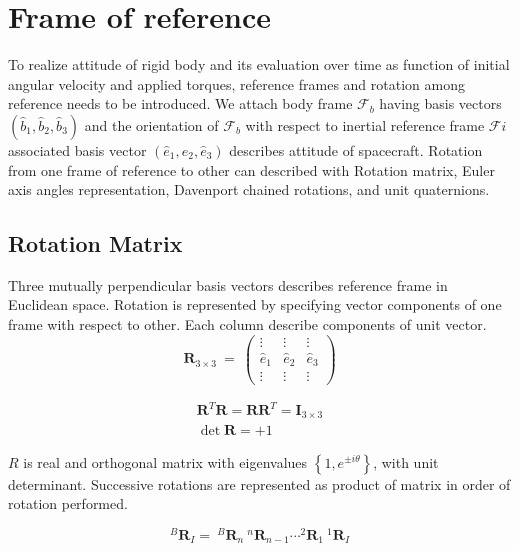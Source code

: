\section{Frame of reference}
To realize attitude of rigid body and its evaluation over time as function of initial angular velocity and applied torques, reference frames and rotation among reference needs to be introduced. We attach body frame $ \mathcal{F}_{b}$ having basis vectors $ (\hat{b}_{1} ,\hat{b}_{2} ,\hat{b}_{3})$ and the orientation of $ \mathcal{F}_{b}$ with respect to inertial reference frame $ \mathcal{F} i$ associated basis vector $ (\hat{e}_{1} ,\hat{e}_{2} ,\hat{e}_{3})$ describes attitude of spacecraft. Rotation from one frame of reference to other can described with Rotation matrix, Euler axis angles representation, Davenport chained rotations, and unit quaternions.

\subsection{Rotation Matrix}
Three mutually perpendicular basis vectors describes reference frame in Euclidean space. Rotation is represented by specifying vector components of one frame with respect to other. Each column describe components of unit vector.
\begin{equation}
\mathbf{R}_{3\times 3} \ =\ \begin{pmatrix}
\vdots  & \vdots  & \vdots \\
\hat{e}_{1} & \hat{e}_{2} & \hat{e}_{3}\\
\vdots  & \vdots  & \vdots 
\end{pmatrix}
\end{equation}

\begin{equation}
\begin{aligned}
\mathbf{R}^{T}\mathbf{R} =\mathbf{RR}^{T} =\mathbf{I}_{3\times 3}\\
\det\mathbf{R} =+1
\end{aligned}
\label{eqn:rotmat}
\end{equation}

$ R$ is real and orthogonal matrix with eigenvalues $ \left\{1,e^{\pm i\theta }\right\}$, with unit determinant. Successive rotations are represented as product of matrix in order of rotation performed.


\begin{equation}
^{B}\mathbf{R}_{I} =\ ^{B}\mathbf{R}_{n} \ ^{n}\mathbf{R}_{n-1} \cdots ^{2}\mathbf{R}_{1} \ ^{1}\mathbf{R}_{I}
\end{equation}

